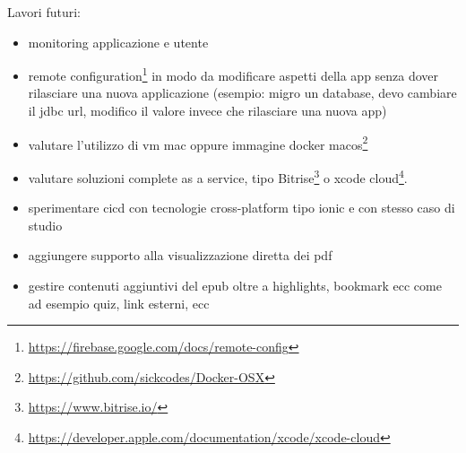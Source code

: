 

Lavori futuri: 
\begin{itemize}
    \item monitoring applicazione e utente
    \item remote configuration\footnote{\url{https://firebase.google.com/docs/remote-config}} in modo da modificare aspetti della app senza dover rilasciare una nuova applicazione (esempio: migro un database, devo cambiare il jdbc url, modifico il valore invece che rilasciare una nuova app)
    \item valutare l'utilizzo di vm mac oppure immagine docker macos\footnote{\url{https://github.com/sickcodes/Docker-OSX}}
    \item valutare soluzioni complete as a service, tipo Bitrise\footnote{\url{https://www.bitrise.io/}} o xcode cloud\footnote{\url{https://developer.apple.com/documentation/xcode/xcode-cloud}}.
    \item sperimentare cicd con tecnologie cross-platform tipo ionic e con stesso caso di studio
    \item aggiungere supporto alla visualizzazione diretta dei pdf
    \item gestire contenuti aggiuntivi del epub oltre a highlights, bookmark ecc come ad esempio quiz, link esterni, ecc
\end{itemize}

